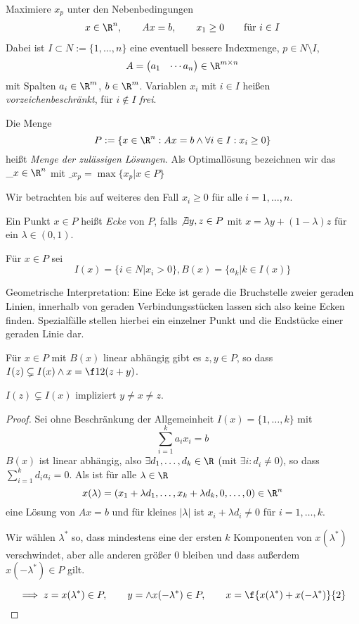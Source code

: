 \documentclass{mycourse}
\begin{document}
\begin{df}
	\label{df:5.3}
	Maximiere $x_p$ unter den Nebenbedingungen
	\begin{align}
		\label{eq:6.7}
		x\in \R^n, \qquad Ax=b, \qquad x_1 \ge 0  \qquad \text{für } i\in I
	\end{align}
	Dabei ist $I\subset N:=\{1,\dotsc,n\}$ eine eventuell bessere Indexmenge, $p\in N\setminus I$,
	\[
		A = \begin{pmatrix}a_1 & \cdots a_n\end{pmatrix} \in \R^{m\times n}
	\]
	mit Spalten $a_i\in \R^m$, $b\in \R^m$.
	Variablen $x_i$ mit $i\in I$ heißen \emph{vorzeichenbeschränkt}, für $i\not\in I$ \emph{frei}.

	Die Menge
	\[
		P := \{ x\in\R^n : Ax=b \land \forall i\in I: x_i \ge 0 \}
	\]
	heißt \emph{Menge der zulässigen Lösungen}.
	Als Optimallösung bezeichnen wir das $\_x\in \R^n$ mit $\_x_p = \max\{x_p|x\in P\}$
\end{df}

Wir betrachten bis auf weiteres den Fall $x_i\ge 0$ für alle $i=1,\dotsc, n$.
\begin{df}[Ecke]
	Ein Punkt $x\in P$ heißt \emph{Ecke} von $P$, falls $\not\exists y,z\in P$ mit $x=\lambda y + (1-\lambda) z$ für ein $\lambda \in (0,1)$.

Für $x\in P$ sei
\[
	I(x) = \{i\in N\big| x_i > 0\}, B(x) = \{a_k | k\in I(x)\}
\]
\end{df}
\begin{note}
Geometrische Interpretation:  Eine Ecke ist gerade die Bruchstelle zweier geraden Linien, innerhalb von geraden Verbindungsstücken lassen sich also keine Ecken finden. Spezialfälle stellen hierbei ein einzelner Punkt und die Endstücke einer geraden Linie dar.  
\end{note}
\begin{lem}
	\label{lem:5.5}
	Für $x\in P$ mit $B(x)$ linear abhängig gibt es $z,y\in P$, so dass $I(z)\subsetneq I(x) \land x=\f12(z+y)$.
	\begin{note}
		$I(z)\subsetneq I(x)$ impliziert $y\neq x \neq z$.
	\end{note}
	\begin{proof}
		Sei ohne Beschränkung der Allgemeinheit $I(x)=\{1,\dotsc, k\}$ mit
		\[
			\sum_{i=1}^k a_ix_i = b
		\]
		$B(x)$ ist linear abhängig, also $\exists d_1,\dotsc,d_k\in \R$ (mit $\exists i:d_i\neq 0$), so dass $\sum_{i=1}^kd_ia_i=0$.
		Als ist für alle $\lambda \in \R$
		\[
			x(\lambda) = (x_1 + \lambda d_1, \dotsc, x_k + \lambda d_k, 0, \dotsc, 0) \in \R^n
		\]
		eine Lösung von $Ax=b$ und für kleines $|\lambda|$ ist $x_i + \lambda d_i \neq 0$ für $i=1,\dotsc,k$.

		Wir wählen $\lambda^*$ so, dass mindestens eine der ersten $k$ Komponenten von $x(\lambda^*)$ verschwindet, aber alle anderen größer $0$ bleiben und dass außerdem $x(-\lambda^*) \in P$ gilt.

		\[
			\implies z=x(\lambda^*) \in P, \qquad y=\land x(-\lambda^*) \in P,  \qquad x=\f{x(\lambda^*) + x(-\lambda^*)}{2}
		\]
	\end{proof}
\end{lem}
\end{document}
